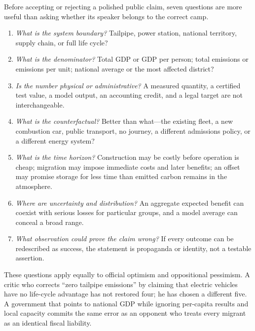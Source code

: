 ﻿\documentclass[12pt,a4paper]{book}
\begin{document}
Before accepting or rejecting a polished public claim, seven questions are
more useful than asking whether its speaker belongs to the correct camp.

\begin{enumerate}
\item \emph{What is the system boundary?}  Tailpipe, power station, national
territory, supply chain, or full life cycle?

\item \emph{What is the denominator?}  Total GDP or GDP per person; total
emissions or emissions per unit; national average or the most affected
district?

\item \emph{Is the number physical or administrative?}  A measured quantity,
a certified test value, a model output, an accounting credit, and a legal
target are not interchangeable.

\item \emph{What is the counterfactual?}  Better than what---the existing
fleet, a new combustion car, public transport, no journey, a different
admissions policy, or a different energy system?

\item \emph{What is the time horizon?}  Construction may be costly before
operation is cheap; migration may impose immediate costs and later benefits;
an offset may promise storage for less time than emitted carbon remains in the
atmosphere.

\item \emph{Where are uncertainty and distribution?}  An aggregate expected
benefit can coexist with serious losses for particular groups, and a model
average can conceal a broad range.

\item \emph{What observation could prove the claim wrong?}  If every outcome
can be redescribed as success, the statement is propaganda or identity, not a
testable assertion.
\end{enumerate}

These questions apply equally to official optimism and oppositional
pessimism.  A critic who corrects ``zero tailpipe emissions'' by claiming that
electric vehicles have no life-cycle advantage has not restored four; he has
chosen a different five.  A government that points to national GDP while
ignoring per-capita results and local capacity commits the same error as an
opponent who treats every migrant as an identical fiscal liability.
\end{document}
